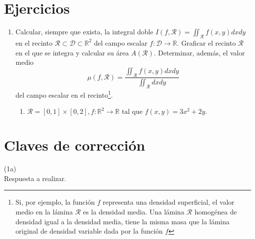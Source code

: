 \section{Ejercicios}

\begin{enumerate}

\item Calcular, siempre que exista, la integral doble $I(f,\mathcal{R}) = \iint_{\mathcal{R}}f(x,y)dxdy$ en el recinto $\mathcal{R} \subset \mathcal{D} \subset \mathbb{R}^2$ del campo escalar $f: \mathcal{D} \rightarrow \mathbb{R}$. Graficar el recinto $\mathcal{R}$ en el que se integra y calcular su \'area $A(\mathcal{R})$. Determinar, adem\'as, el valor medio $$\mu(f,\mathcal{R}) = \frac{\iint_{\mathcal{R}}f(x,y)dxdy}{\iint_{\mathcal{R}}dxdy}$$ del campo escalar en el recinto\footnote{Si, por ejemplo, la funci\'on $f$ representa una densidad superficial, el valor medio en la l\'amina $\mathcal{R}$ es la densidad media. Una l\'amina $\mathcal{R}$ homog\'enea de densidad igual a la densidad media, tiene la misma masa que la l\'amina original de densidad variable dada por la funci\'on $f$}.
\begin{enumerate}
	\item $\mathcal{R} = \left[ 0, 1 \right] \times \left[ 0, 2 \right], f: \mathbb{R}^2 \rightarrow \mathbb{R} \textrm{ tal que } f(x,y) = 3x^2 + 2y$.
\end{enumerate}

\end{enumerate}

\section{Claves de correcci\'on}

\begin{exercise}

(1a)\\
Respuesta a realizar.


\end{exercise}